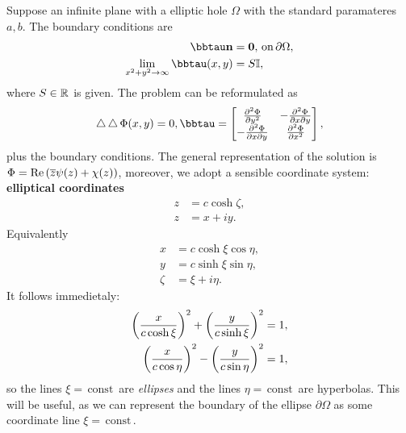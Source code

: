 \documentclass[../main.tex]{subfiles}
\begin{document}
Suppose an infinite plane with a elliptic hole $\Omega$ with the standard paramateres $a,b$. The boundary conditions are
\begin{align*}
	\bbtau \vb{n} &= \vb{0}, \, \text{on} \, \partial \Omega,\\
	\lim_{x^{2}+y^{2}\to \infty}\bbtau\qty(x,y) &= S \identity,
\end{align*}
where $S \in {\mathbb R}$ is given. The problem can be reformulated as
\begin{equation}
	\laplace \laplace \Phi\qty(x,y) = 0, \bbtau = \begin{bmatrix}
		\pdv[2]{\Phi}{y} & -\pdv[2]{\Phi}{x}{y} \\
		- \pdv[2]{\Phi}{x}{y} & \pdv[2]{\Phi}{x}
	\end{bmatrix},
\end{equation}
plus the boundary conditions. The general representation of the solution is $ \Phi = \Re\qty(\overline{z}\psi(z)+\chi(z))$, moreover, we adopt a sensible coordinate system: \textbf{elliptical coordinates}
\begin{align*}
	z &= c \cosh \zeta,\\
	z &= x + i y.
\end{align*}
Equivalently
\begin{align*}
	x &= c \cosh \xi \cos \eta, \\
	y &= c \sinh \xi \sin \eta, \\
	\zeta &= \xi + i \eta.
\end{align*}
It follows immedietaly:
\begin{align*}
	\qty(\frac{x}{c\cosh \xi})^{2} + \qty(\frac{y}{c\sinh \xi})^{2} &= 1, \\ 
	\qty(\frac{x}{c\cos \eta})^{2}-\qty(\frac{y}{c \sin \eta})^{2} &= 1,
\end{align*}
so the lines $\xi = \, \text{const} \,$ are \textit{ellipses} and the lines $\eta = \, \text{const} \,$ are hyperbolas. This will be useful, as we can represent the boundary of the ellipse $\partial \Omega$ as some coordinate line $\xi = \, \text{const} \,.$
\end{document}
